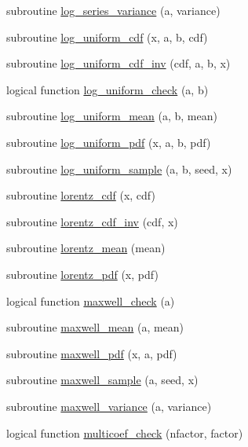 \begin{DoxyCompactItemize}
\item 
subroutine \hyperlink{subroutines_8f_ac3ab3c963d117a0ca318fa9e93c94269}{log\+\_\+series\+\_\+variance} (a, variance)
\item 
subroutine \hyperlink{subroutines_8f_adf657f01da631a8c9b66c18577cf36d0}{log\+\_\+uniform\+\_\+cdf} (x, a, b, cdf)
\item 
subroutine \hyperlink{subroutines_8f_af932827c125bbf033c8f22fb759fb08d}{log\+\_\+uniform\+\_\+cdf\+\_\+inv} (cdf, a, b, x)
\item 
logical function \hyperlink{subroutines_8f_ac8db4920c6abba6ea655fdc986813e62}{log\+\_\+uniform\+\_\+check} (a, b)
\item 
subroutine \hyperlink{subroutines_8f_a87623ea0ca476d299aefc8ad2fe08737}{log\+\_\+uniform\+\_\+mean} (a, b, mean)
\item 
subroutine \hyperlink{subroutines_8f_a2e6d975a71a9e29048cc71f0f1c34702}{log\+\_\+uniform\+\_\+pdf} (x, a, b, pdf)
\item 
subroutine \hyperlink{subroutines_8f_af90ae492b3515c794d1306f8ccf26c05}{log\+\_\+uniform\+\_\+sample} (a, b, seed, x)
\item 
subroutine \hyperlink{subroutines_8f_a2d42ac4119c6b4409d419ed9e81a03a0}{lorentz\+\_\+cdf} (x, cdf)
\item 
subroutine \hyperlink{subroutines_8f_a84e9578341d986571a9a7c3aeb2686cc}{lorentz\+\_\+cdf\+\_\+inv} (cdf, x)
\item 
subroutine \hyperlink{subroutines_8f_ad35ecd2cd051d54d3d353c19535da898}{lorentz\+\_\+mean} (mean)
\item 
subroutine \hyperlink{subroutines_8f_aea9281c529fa599fe1103e8d74d33ddc}{lorentz\+\_\+pdf} (x, pdf)
\item 
logical function \hyperlink{subroutines_8f_a564cd13e2df2d52e551d88aa36765b6a}{maxwell\+\_\+check} (a)
\item 
subroutine \hyperlink{subroutines_8f_a3f296baf8d60383b265a902b92a27492}{maxwell\+\_\+mean} (a, mean)
\item 
subroutine \hyperlink{subroutines_8f_aa5b48a50fd2163385ad84b879e0721ef}{maxwell\+\_\+pdf} (x, a, pdf)
\item 
subroutine \hyperlink{subroutines_8f_a288b473fa5808b049b36853ca23b9285}{maxwell\+\_\+sample} (a, seed, x)
\item 
subroutine \hyperlink{subroutines_8f_abd87aa98d26597779513c64c2fbe17e5}{maxwell\+\_\+variance} (a, variance)
\item 
logical function \hyperlink{subroutines_8f_a7119e53d608affd356f7026eef9d2c6b}{multicoef\+\_\+check} (nfactor, factor)

\end{DoxyCompactItemize}
